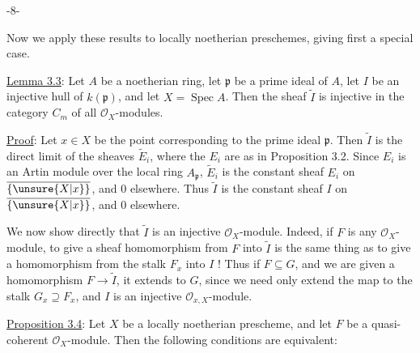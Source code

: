
\begin{center}-8-\end{center}

Now we apply these results to locally noetherian preschemes, giving first a special case.

\uline{Lemma 3.3}: Let $A$ be a noetherian ring, let $\mathfrak p$ be a prime ideal of $A$, let $I$ be an injective hull of $k(\mathfrak p)$, and let $X=\operatorname{Spec}A$. Then the sheaf $\widetilde I$ is injective in the category $C_m$ of all $\mathcal O_X$-modules.

\uline{Proof}: Let $x\in X$ be the point corresponding to the prime ideal $\mathfrak p$. Then $\widetilde I$ is the direct limit of the sheaves $\widetilde E_i$, where the $E_i$ are as in Proposition 3.2. Since $E_i$ is an Artin module over the local ring $A_{\mathfrak p}$, $\widetilde E_i$ is the constant sheaf $E_i$ on $\overline{\{\unsure{X|x}\}}$, and $0$ elsewhere. Thus $\widetilde I$ is the constant sheaf $I$ on $\overline{\{\unsure{X|x}\}}$, and $0$ elsewhere.

We now show directly that $\widetilde I$ is an injective $\mathcal O_X$-module. Indeed, if $F$ is any $\mathcal O_X$-module, to give a sheaf homomorphism from $F$ into $\widetilde I$ is the same thing as to give a homomorphism from the stalk $F_x$ into $I$ ! Thus if $F\subseteq G$, and we are given a homomorphism $F\longrightarrow\widetilde I$, it extends to $G$, since we need only extend the map to the stalk $G_x\supseteq F_x$, and $I$ is an injective $\mathcal O_{x,X}$-module.

\uline{Proposition 3.4}: Let $X$ be a locally noetherian prescheme, and let $F$ be a quasi-coherent $\mathcal O_X$-module. Then the following conditions are equivalent:

